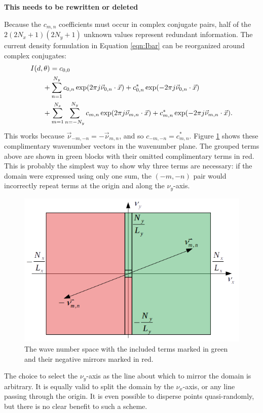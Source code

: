 \documentclass{article}
\def\x{\vec{x}}
\def\vnu{\vec{\nu}_{m,n}}
\begin{document}
{\bf This needs to be rewritten or deleted}

Because the $c_{m,n}$ coefficients must occur in complex conjugate pairs, half of the $2(2N_x+1)(2N_y+1)$ unknown values represent redundant information.  The current density formulation in Equation \ref{eqn:Ibar} can be reorganized around complex conjugates:
\begin{align}
I(d,\theta) &= c_{0,0} \nonumber\\
& \hspace{-1em} + \sum_{n=1}^{N_y} c_{0,n} \exp(2\pi j \vec{\nu}_{0,n} \cdot \x) + c_{0,n}^* \exp(-2\pi j \vec{\nu}_{0,n} \cdot \x)\nonumber\\
& \hspace{-1em} + \sum_{m=1}^{N_x}\sum_{n=-N_y}^{N_y} c_{m,n} \exp(2\pi j \vec{\nu}_{m,n} \cdot \x) + c_{m,n}^* \exp(-2\pi j \vec{\nu}_{m,n} \cdot \x).
\end{align}
This works because $\vec{\nu}_{-m,-n} = -\vnu$, and so $c_{-m,-n} = c_{m,n}^*$.  Figure \ref{fig:wavenumbers} shows these complimentary wavenumber vectors in the wavenumber plane.  The grouped terms above are shown in green blocks with their omitted complimentary terms in red.  This is probably the simplest way to show why three terms are necessary: if the domain were expressed using only one sum, the $(-m,-n)$ pair would incorrectly repeat terms at the origin and along the $\nu_y$-axis.  

\begin{figure}
\centering
\includegraphics[width=0.9\linewidth]{figures/wavenumbers}
\caption{The wave number space with the included terms marked in green and their negative mirrors marked in red.}\label{fig:wavenumbers}
\end{figure}

The choice to select the $\nu_y$-axis as the line about which to mirror the domain is arbitrary.  It is equally valid to split the domain by the $\nu_x$-axis, or any line passing through the origin.  It is even possible to disperse points quasi-randomly, but there is no clear benefit to such a scheme.
\end{document}
